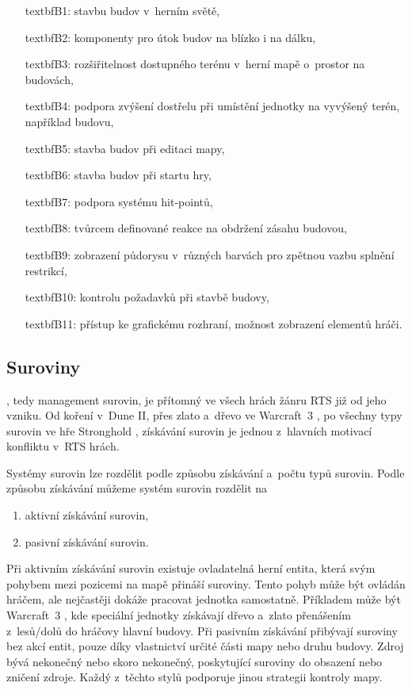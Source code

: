 \begin{itemize}
	\item[textbf{B1:}] stavbu budov v~herním světě,
	\item[textbf{B2:}] komponenty pro útok budov na blízko i na dálku,
	\item[textbf{B3:}] rozšiřitelnost dostupného terénu v~herní mapě o~prostor na budovách,
	\item[textbf{B4:}] podpora zvýšení dostřelu při umístění jednotky na vyvýšený terén, například budovu,
	\item[textbf{B5:}] stavba budov při editaci mapy,
	\item[textbf{B6:}] stavba budov při startu hry,
	\item[textbf{B7:}] podpora systému hit-pointů,
	\item[textbf{B8:}] tvůrcem definované reakce na obdržení zásahu budovou,
	\item[textbf{B9:}] zobrazení půdorysu v~různých barvách pro zpětnou vazbu splnění restrikcí,
	\item[textbf{B10:}] kontrolu požadavků při stavbě budovy,
	\item[textbf{B11:}] přístup ke grafickému rozhraní, možnost zobrazení elementů hráči.
\end{itemize}


\subsection{Suroviny}
\label{sec:suroviny}
 , tedy management surovin, je přítomný ve všech hrách žánru RTS již od jeho vzniku. Od koření v~Dune II, přes zlato a~dřevo ve Warcraft~3 \citep{site:warcraft3}, po všechny typy surovin ve hře Stronghold \citep{site:strongholdcrus}, získávání surovin je jednou z~hlavních motivací konfliktu v~RTS hrách. 

Systémy surovin lze rozdělit podle způsobu získávání a~počtu typů surovin. Podle způsobu získávání můžeme systém surovin rozdělit na
\begin{enumerate}
	\item aktivní získávání surovin,
	\item pasivní získávání surovin.
\end{enumerate}

Při aktivním získávání surovin existuje ovladatelná herní entita, která svým pohybem mezi pozicemi na mapě přináší suroviny. Tento pohyb může být ovládán hráčem, ale nejčastěji dokáže pracovat jednotka samostatně. Příkladem může být Warcraft~3 \citep{site:warcraft3}, kde speciální jednotky získávají dřevo a~zlato přenášením z~lesů/dolů do hráčovy hlavní budovy. Při pasivním získávání přibývají suroviny bez akcí entit, pouze díky vlastnictví určité části mapy nebo druhu budovy. Zdroj bývá nekonečný nebo skoro nekonečný, poskytující suroviny do obsazení nebo zničení zdroje. Každý z~těchto stylů podporuje jinou strategii kontroly mapy.

